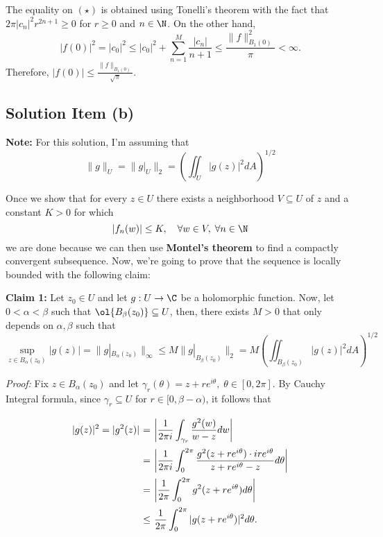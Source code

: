 The equality on $(\star)$ is obtained using Tonelli's theorem with the fact that $2\pi |c_n|^2 r^{2n+1} \geq 0$ for $r \geq 0$ and $n\in \N$. On the other hand,
\[ |f(0)|^2 = |c_0|^2 \leq |c_0|^2 + \sum_{n = 1}^{M} \frac{|c_n|}{n+1} \leq \frac{\|f\|^2_{B_1(0)}}{\pi} < \infty. \]
Therefore, $|f(0)| \leq \frac{\|f\|_{B_1(0)}}{\sqrt{\pi}}$.


\subsection*{Solution Item (b)}

\textbf{Note:} For this solution, I'm assuming that
\[  \|g\|_U =  \|g|_U\|_2 = \left( \iint_{U} |g(z)|^2 dA \right)^{1/2} \]

Once we show that for every $z\in U$ there exists a neighborhood $V \subseteq U$ of $z$ and a constant $K > 0$ for which
\[ |f_n(w)| \leq K,\hspace{1em}  \forall w \in V,\; \forall n \in \N \]
we are done because we can then use \textbf{Montel's theorem} to find a compactly convergent subsequence. Now, we're going to prove that the sequence is locally bounded with the following claim:

\textbf{Claim 1:} Let $z_0 \in U$ and let $g: U \to\C$ be a holomorphic function. Now, let $0< \alpha < \beta$ such that $\ol{B_\beta (z_0)} \subseteq U$, then, there exists $M > 0$ that only depends on $\alpha,\beta$ such that
\[ \sup_{z\in B_\alpha(z_0)}|g(z)| = \|g|_{B_\alpha (z_0)}\|_\infty \leq M \|g|_{B_\beta (z_0)}\|_2 = M \left( \iint_{B_\beta (z_0)} |g(z)|^2 dA \right)^{1/2}\]

\textit{Proof:} Fix $z \in B_\alpha(z_0)$ and let $\gamma_r(\theta) = z + r e^{i\theta},\; \theta \in [0,2\pi]$. By Cauchy Integral formula, since $\gamma_r \subseteq U$ for $ r \in [0,\beta-\alpha)$, it follows that
\[ \everymath{\displaystyle}
\arraycolsep=1.8pt\def\arraystretch{2.5}
\begin{array}{rcl}
    |g(z)|^2 = |g^2(z)| & = & \left| \frac{1}{2\pi i}\int_{\gamma_r} \frac{g^2(w)}{w-z} dw \right|\\
    & = & \left| \frac{1}{2\pi i} \int_{0}^{2\pi} \frac{g^2(z + r e^{i\theta }) \cdot ir e^{i\theta}}{z + r e^{i\theta }-z} d\theta \right|\\
    & = & \left| \frac{1}{2\pi} \int_{0}^{2\pi} g^2(z + r e^{i\theta })  d\theta \right|\\
    & \leq & \frac{1}{2\pi} \int_{0}^{2\pi} |g(z + r e^{i\theta })|^2 d\theta.
\end{array} \]

